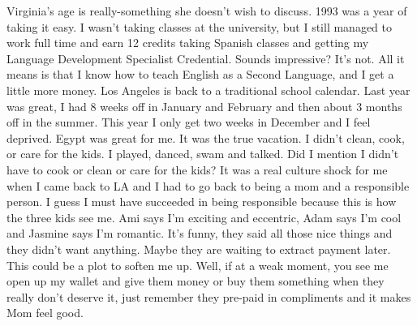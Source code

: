 Virginia's age is really-something she doesn't wish to discuss. 1993 was a year of taking it easy. I wasn't taking classes at the university,
but I still managed to work full time and earn 12 credits taking Spanish classes and getting my Language Development Specialist Credential.
Sounds impressive? It's not. All it means is that I know how to teach English as a Second Language, and I get a little more money. Los Angeles
is back to a traditional school calendar. Last year was great, I had 8 weeks off in January and February and then about 3 months off in the
summer. This year I only get two weeks in December and I feel deprived. Egypt was great for me. It was the true vacation. I didn't clean, cook,
or care for the kids. I played, danced, swam and talked. Did I mention I didn't have to cook or clean or care for the kids? It was a real
culture shock for me when I came back to LA and I had to go back to being a mom and a responsible person. I guess I must have succeeded in being
responsible because this is how the three kids see me. Ami says I'm exciting and eccentric, Adam says I'm cool and Jasmine says I'm romantic.
It's funny, they said all those nice things and they didn't want anything. Maybe they are waiting to extract payment later. This could be a plot
to soften me up. Well, if at a weak moment, you see me open up my wallet and give them money or buy them something when they really don't
deserve it, just remember they pre-paid in compliments and it makes Mom feel good.


